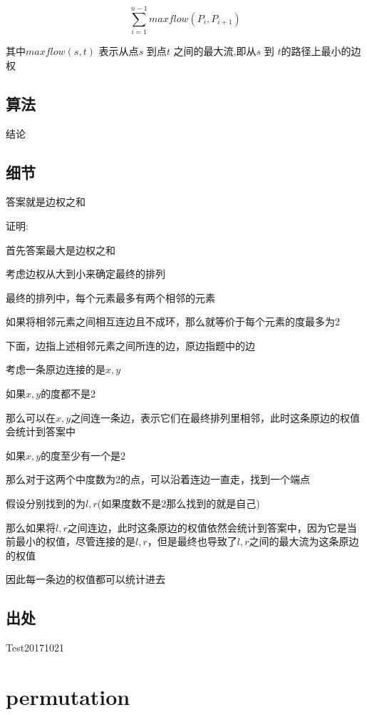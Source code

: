 \documentclass[a4paper]{article}
\begin{document}
		$$\sum_{i=1}^{n-1} maxflow (P_i,P_{i+1})$$
		
		其中$ maxflow(s, t)$ 表示从点$ s$ 到点$ t$ 之间的最大流,即从$ s$ 到 $t $的路径上最小的边权
		
	\subsection{算法}
		
		结论
		
	\subsection{细节}
		
		答案就是边权之和
		
		证明:
		
		首先答案最大是边权之和
		
		考虑边权从大到小来确定最终的排列
		
		最终的排列中，每个元素最多有两个相邻的元素
		
		如果将相邻元素之间相互连边且不成环，那么就等价于每个元素的度最多为2
		
		下面，边指上述相邻元素之间所连的边，原边指题中的边
		
		考虑一条原边连接的是$x,y$
		
		如果$x,y$的度都不是2
		
		那么可以在$x,y$之间连一条边，表示它们在最终排列里相邻，此时这条原边的权值会统计到答案中
		
		如果$x,y$的度至少有一个是2
		
		那么对于这两个中度数为2的点，可以沿着连边一直走，找到一个端点
		
		假设分别找到的为$l,r$(如果度数不是2那么找到的就是自己)
		
		那么如果将$l,r$之间连边，此时这条原边的权值依然会统计到答案中，因为它是当前最小的权值，尽管连接的是$l,r$，但是最终也导致了$l,r$之间的最大流为这条原边的权值
		
		因此每一条边的权值都可以统计进去
		
	\subsection{出处}
		
		Test20171021
	
	\newpage
	
	\section{permutation}
		
\end{document}
